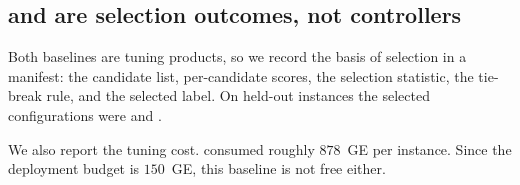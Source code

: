 \subsection{ and  are selection
outcomes, not controllers}

Both baselines are tuning products, so we record the basis of selection in a
manifest: the candidate list, per-candidate scores, the selection statistic, the
tie-break rule, and the selected label. On held-out instances the selected
configurations were  and .

We also report the tuning cost.  consumed roughly
$878$~GE per instance. Since the deployment budget is $150$~GE, this baseline is
not free either.
